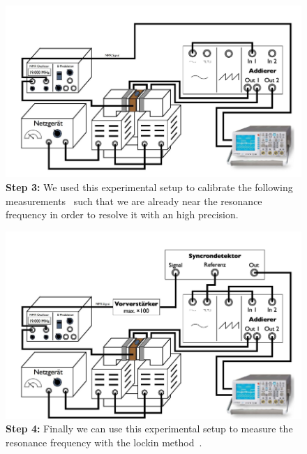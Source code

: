 \begin{figure}[htpb]
    \centering
    \includegraphics[width=0.8\linewidth]{figures/setup3}
    \caption{\textbf{Step 3:}
        We used this experimental setup to calibrate the following
        measurements~\cite{versuchsanleitung} such that we are already
        near the resonance frequency in order to resolve it with an high
        precision.}
    \label{fig:figures/setup1}
\end{figure}
\begin{figure}[htpb]
    \centering
    \includegraphics[width=0.8\linewidth]{figures/setup4}
    \caption{\textbf{Step 4:}
        Finally we can use this experimental setup to measure
        the resonance frequency with the lockin method~\cite{versuchsanleitung}.}

    \label{fig:figures/setup1}
\end{figure}
\clearpage




